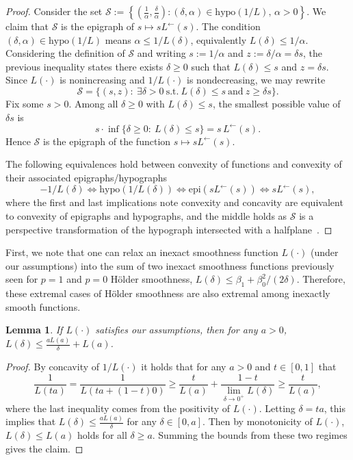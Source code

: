\documentclass[11pt, hidelinks]{article}
\numberwithin{equation}{section}
\theoremstyle{thmstyletwo}%
\newtheorem{lemma}[thm]{Lemma}
\numberwithin{equation}{section}
\newcommand{\Holder}{H\"older }
\newcommand{\Lleft}{L^{\leftarrow}}
\begin{document}
\begin{proof}
Consider the set $\mathcal S:=\left\{\left(\frac{1}{\alpha},\frac{\delta}{\alpha}\right): (\delta,\alpha)\in \mathrm{hypo}(1/L), \, \alpha > 0\right\}$. We claim that $\mathcal S$ is the epigraph of $s\mapsto s\Lleft(s)$. The condition $(\delta,\alpha)\in\mathrm{hypo}(1/L)$ means $\alpha\le 1/L(\delta)$, equivalently $L(\delta)\le 1/\alpha$. Considering the definition of $\mathcal{S}$ and writing $s:=1/\alpha$ and $z:=\delta/\alpha=\delta s$, the previous inequality states there exists $\delta \geq 0$ such that $L(\delta)\le s$ and $z=\delta s$. Since $L(\cdot)$ is nonincreasing and $1/L(\cdot)$ is nondecreasing, we may rewrite
$$
\mathcal S=\{(s,z):\ \exists \delta>0\ \text{s.t.}\ L(\delta)\le s\ \text{and}\ z\ge \delta s\}.
$$
Fix some $s>0$. Among all $\delta \geq0$ with $L(\delta)\le s$, the smallest possible value of $\delta s$ is
$$
s\cdot\inf\{\delta \geq 0:\ L(\delta)\le s\}=s\,\Lleft(s).
$$
Hence $\mathcal S$ is the epigraph of the function $s\mapsto s\Lleft(s)$.

The following equivalences hold between convexity of functions and convexity of their associated epigraphs/hypographs $$-1/L(\delta) \Longleftrightarrow \mathrm{hypo}(1/L(\delta)) \Longleftrightarrow \mathrm{epi}(s \Lleft(s)) \Longleftrightarrow s \Lleft(s),$$
where the first and last implications note convexity and concavity are equivalent to convexity of epigraphs and hypographs, and the middle  holds as $\mathcal{S}$ is a perspective transformation of the hypograph intersected with a halfplane~\cite[Section 2.3.3]{boyd2004convex}. 
\end{proof}

First, we note that one can relax an inexact smoothness function $L(\cdot)$ (under our assumptions) into the sum of two inexact smoothness functions previously seen for $p=1$ and $p=0$ \Holder smoothness, $L(\delta) \leq \beta_1 + \beta_0^2/(2\delta)$. Therefore, these extremal cases of \Holder smoothness are also extremal among inexactly smooth functions.  
\begin{lemma}\label{smooth plus nonsmooth bound on L}
    If $L(\cdot)$ satisfies our assumptions, then for any $a > 0$, $L(\delta) \leq \frac{aL\left(a\right)}{\delta}+L\left(a\right)$.
\end{lemma}
\begin{proof}
   By concavity of $1/L(\cdot)$ it holds that for any $a > 0$ and $t \in [0,1]$ that $$\frac{1}{L(ta)} = \frac{1}{L(ta + (1-t)0)} \geq \frac{t}{L(a)}+\frac{1-t}{\lim_{\delta \to 0^+}L(\delta)} \geq \frac{t}{L(a)},$$ where the last inequality comes from the positivity of $L(\cdot)$. Letting $\delta = ta$, this implies that $L(\delta) \leq \frac{aL(a)}{\delta}$ for any $\delta\in[0,a]$. Then by monotonicity of $L(\cdot)$, $L(\delta) \leq L(a)$ holds for all $\delta \geq a$. Summing the bounds from these two regimes gives the claim.
\end{proof}
\end{document}
